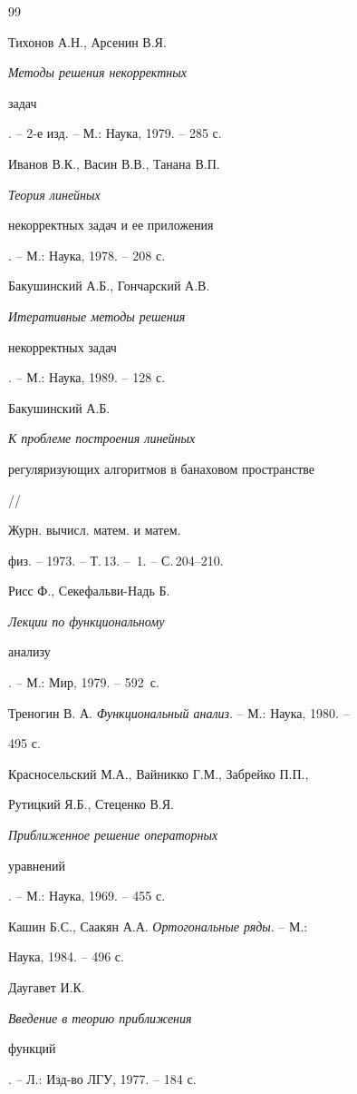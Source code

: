 \begin{thebibliography}{99}







Тихонов А.Н., Арсенин В.Я. {\em Методы решения некорректных


задач}. -- 2-е изд. -- М.: Наука, 1979. -- 285 с.




Иванов В.К., Васин В.В., Танана В.П. {\em Теория линейных 


некорректных задач и ее приложения}. -- М.: Наука, 1978. -- 208 с.




Бакушинский А.Б., Гончарский А.В. {\em Итеративные методы решения


некорректных задач}. -- М.: Наука, 1989. -- 128 с.




Бакушинский А.Б. {\em К проблеме построения линейных


регуляризующих алгоритмов в банаховом пространстве} //


Журн. вычисл. матем. и матем.


физ. -- 1973. -- Т.\,13. -- \No\,1. -- С.\,204--210.




Рисс Ф., Секефальви-Надь Б. {\em Лекции по функциональному


анализу}. -- М.: Мир, 1979. -- 592~с.




Треногин В. А. {\em Функциональный анализ}. -- М.: Наука, 1980. --


495 с.




Красносельский М.А., Вайникко Г.М., Забрейко П.П.,


Рутицкий Я.Б., Стеценко В.Я. {\em Приближенное решение операторных


уравнений}. -- М.: Наука, 1969. -- 455 с.




Кашин Б.С., Саакян А.А. {\em Ортогональные ряды}. -- М.:


Наука, 1984. -- 496 с.




Даугавет И.К. {\em Введение в теорию приближения


функций}. -- Л.: Изд-во ЛГУ, 1977. -- 184 с.



\end{thebibliography}
